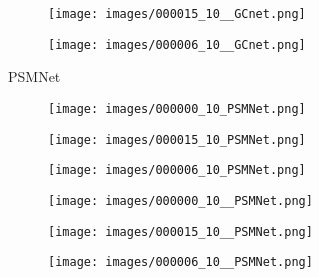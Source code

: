 \documentclass[10pt,twocolumn,letterpaper]{article}
\begin{document}
\begin{figure*}[htpb]
\begin{center}
\begin{minipage}[c]{0.985\textwidth}
\begin{subfigure}[c]{0.33\linewidth}
			\end{subfigure}
			\hspace{-0.5\baselineskip}
			\hfill
			\begin{subfigure}[c]{0.33\linewidth}
				\texttt{[image: images/000015\_10\_\_GCnet.png]}
			\end{subfigure}
			\hspace{-0.5\baselineskip}
			\hfill
			\begin{subfigure}[c]{0.33\linewidth}
				\texttt{[image: images/000006\_10\_\_GCnet.png]}
			\end{subfigure}
		\end{minipage}
\begin{minipage}[c]{0.01\textwidth}
			\begin{turn}{90}\footnotesize{PSMNet \cite{chang2018pyramid}}\end{turn}			
		\end{minipage}
		\begin{minipage}[c]{0.985\textwidth}
			\begin{subfigure}[c]{0.33\linewidth}
				\texttt{[image: images/000000\_10\_PSMNet.png]}
			\end{subfigure}
			\hspace{-0.5\baselineskip}
			\hfill
			\begin{subfigure}[c]{0.33\linewidth}
				\texttt{[image: images/000015\_10\_PSMNet.png]}
			\end{subfigure}
			\hspace{-0.5\baselineskip}
			\hfill
			\begin{subfigure}[c]{0.33\linewidth}
				\texttt{[image: images/000006\_10\_PSMNet.png]}
			\end{subfigure}
			\begin{subfigure}[c]{0.33\linewidth}
				\texttt{[image: images/000000\_10\_\_PSMNet.png]}
			\end{subfigure}
			\hspace{-0.5\baselineskip}
			\hfill
			\begin{subfigure}[c]{0.33\linewidth}
				\texttt{[image: images/000015\_10\_\_PSMNet.png]}
			\end{subfigure}
			\hspace{-0.5\baselineskip}
			\hfill
			\begin{subfigure}[c]{0.33\linewidth}
				\texttt{[image: images/000006\_10\_\_PSMNet.png]}
			\end{subfigure}

\end{minipage}
\end{center}
\end{figure*}
\end{document}
